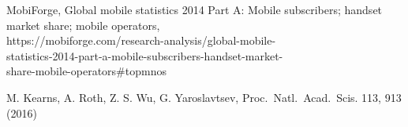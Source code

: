 \documentclass[USenglish,oneside,twocolumn]{article}
\begin{document}
\begin{thebibliography}{99}
 MobiForge, Global mobile statistics 2014 Part A: 
Mobile subscribers; handset market share; mobile operators,\\ 
https://mobiforge.com/research-analysis/global-mobile-\\
statistics-2014-part-a-mobile-subscribers-handset-market-\\
share-mobile-operators\#topmnos

 M. Kearns, A. Roth, Z. S. Wu, G. Yaroslavtsev, 
Proc.~Natl.~Acad.~Scis. 113, 913 (2016)

\end{thebibliography}
\end{document}
